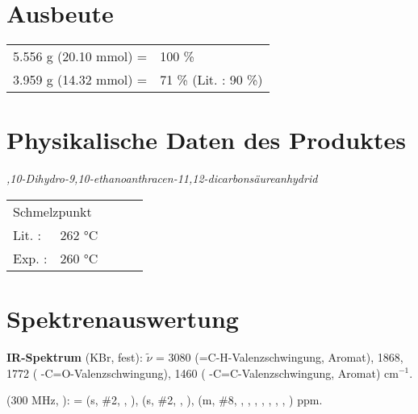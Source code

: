 \documentclass[12pt]{article}
\begin{document}
\begin{onehalfspace}
\section{Ausbeute} 
\begin{tabular}{ rl}
  5.556 g (20.10 mmol) =  & 100 \%\\
  3.959 g (14.32 mmol) =  & 71  \% (Lit.\cite{organikum} : 90 \%) \\
 \end{tabular}
\section{Physikalische Daten des Produktes} 
\textit{,10-Dihydro-9,10-ethanoanthracen-11,12-dicarbonsäureanhydrid} \\[0.2cm]
\begin{tabular}{ lrclc }
 \multicolumn{2}{l}{Schmelzpunkt} & &   \\
   Lit. \cite{organikum} : &  262 \si{\celsius}  & &  \\
   Exp. :&  260 \si{\celsius} & &  \\
 \end{tabular}

\section{Spektrenauswertung} 
\textbf{IR-Spektrum} (KBr, fest): $\tilde{\nu}$ = 3080 (=C-H-Valenzschwingung, Aromat), 1868, 1772 ( -C=O-Valenzschwingung), 1460 ( -C=C-Valenzschwingung, Aromat) cm$^{-1}$.\\

\begin{experimental}[format=\bfseries,delta=(ppm),list=true,use-equal,pos-number = side]
\begin{minipage}[b]{0.60\textwidth} 
\NMR* (300 \si{\MHz}, ): \chemdelta\hspace{3pt}=
 (s, \#{2}, , ),
 (s, \#{2}, , ),
 (m, \#{8}, , , , , , , , ) ppm.
\end{minipage}
 \hfill
\begin{minipage}[t][][b]{0.4\textwidth} 


\end{minipage}
\end{experimental}
\end{onehalfspace}
\end{document}
